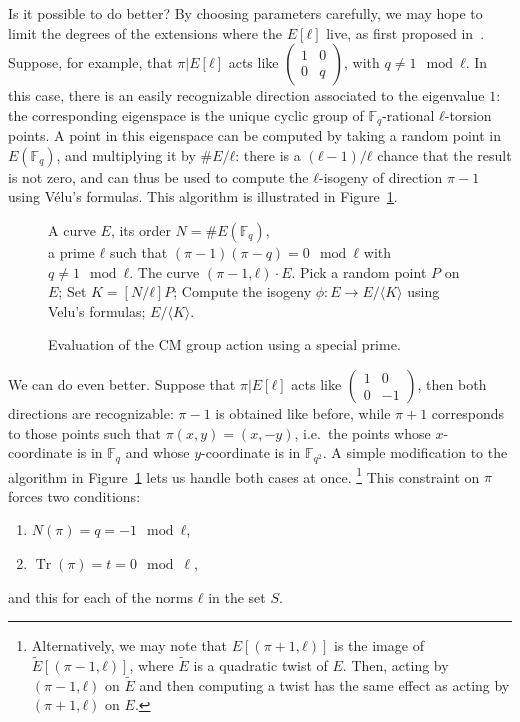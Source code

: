 \documentclass[10pt]{article}
\theoremstyle{plain}
\theoremstyle{definition}
\DeclareMathOperator{\Tr}{Tr} %
\def\F{\ensuremath{\mathbb{F}}}
\def\mat#1{\left(\begin{smallmatrix}#1\end{smallmatrix}\right)}
\begin{document}
Is it possible to do better? %
By choosing parameters carefully, we may hope to limit the degrees of
the extensions where the $E[ℓ]$ live, as first proposed
in~\cite{AC:DeFKieSmi18}. %
Suppose, for example, that $π|E[ℓ]$ acts like $\mat{1&0\\0&q}$, with
$q≠1 \mod ℓ$. %
In this case, there is an easily recognizable direction associated to
the eigenvalue $1$: the corresponding eigenspace is the unique cyclic
group of $\F_q$-rational $ℓ$-torsion points. %
A point in this eigenspace can be computed by taking a random point in
$E(\F_q)$, and multiplying it by $\#E/ℓ$: there is a $(ℓ-1)/ℓ$ chance
that the result is not zero, and can thus be used to compute the
$ℓ$-isogeny of direction $π-1$ using Vélu's formulas. %
This algorithm is illustrated in Figure~\ref{fig:CM-eval}.

\begin{figure}
  \centering
  \begin{algorithmic}[1]
    \REQUIRE A curve $E$, its order $N = \#E(\F_q)$,\\
    a prime $ℓ$ such that $(π - 1)(π - q) = 0 \mod ℓ$ with $q≠1 \mod ℓ$.
    \ENSURE The curve $(π-1,ℓ)·E$.
    \REPEAT
    \STATE Pick a random point $P$ on $E$;
    \STATE Set $K = [N/ℓ]P$;
    \STATE Compute the isogeny $ϕ : E → E/〈K〉$ using Velu's formulas;
    \RETURN $E/〈K〉$.
  \end{algorithmic}
  
  \caption{Evaluation of the CM group action using a special prime.}
  \label{fig:CM-eval}
\end{figure}

We can do even better. %
Suppose that $π|E[ℓ]$ acts like $\mat{1&0\\0&-1}$, then both
directions are recognizable: $π-1$ is obtained like before, while
$π+1$ corresponds to those points such that $π(x,y) = (x,-y)$, i.e.\
the points whose $x$-coordinate is in $\F_q$ and whose $y$-coordinate
is in $\F_{q^2}$. %
A simple modification to the algorithm in Figure~\ref{fig:CM-eval}
lets us handle both cases at once.%
\footnote{Alternatively, we may note that $E[(π+1,ℓ)]$ is the image of
  $\tilde{E}[(π-1,ℓ)]$, where $\tilde{E}$ is a quadratic twist of
  $E$. %
  Then, acting by $(π-1,ℓ)$ on $\tilde{E}$ and then computing a twist
  has the same effect as acting by $(π+1,ℓ)$ on $E$.} %
This constraint on $π$ forces two conditions:
\begin{enumerate}
\item $N(π) = q=-1 \mod ℓ$,
\item $\Tr(π) = t = 0 \mod\ell$,
\end{enumerate}
and this for each of the norms $ℓ$ in the set $S$.
\end{document}

